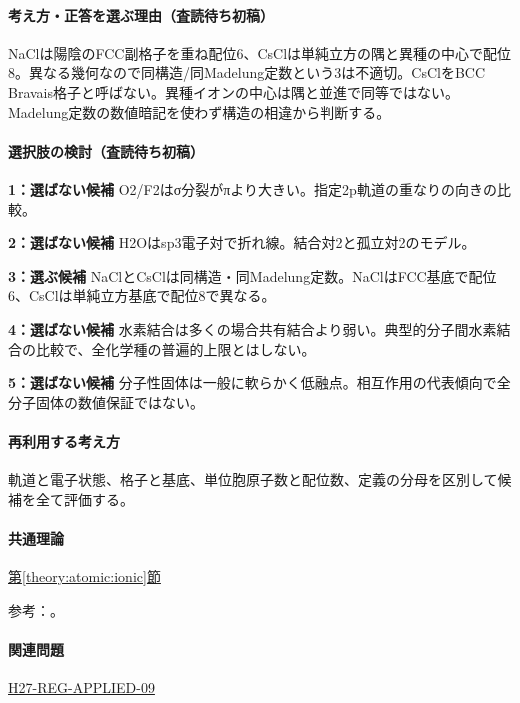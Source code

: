 \paragraph{考え方・正答を選ぶ理由（査読待ち初稿）} NaClは陽陰のFCC副格子を重ね配位6、CsClは単純立方の隅と異種の中心で配位8。異なる幾何なので同構造/同Madelung定数という3は不適切。CsClをBCC Bravais格子と呼ばない。異種イオンの中心は隅と並進で同等ではない。Madelung定数の数値暗記を使わず構造の相違から判断する。

\paragraph{選択肢の検討（査読待ち初稿）}\mbox{}\par

\noindent\textbf{1：選ばない候補} O2/F2はσ分裂がπより大きい。指定2p軌道の重なりの向きの比較。\par

\noindent\textbf{2：選ばない候補} H2Oはsp3電子対で折れ線。結合対2と孤立対2のモデル。\par

\noindent\textbf{3：選ぶ候補} NaClとCsClは同構造・同Madelung定数。NaClはFCC基底で配位6、CsClは単純立方基底で配位8で異なる。\par

\noindent\textbf{4：選ばない候補} 水素結合は多くの場合共有結合より弱い。典型的分子間水素結合の比較で、全化学種の普遍的上限とはしない。\par

\noindent\textbf{5：選ばない候補} 分子性固体は一般に軟らかく低融点。相互作用の代表傾向で全分子固体の数値保証ではない。\par

\paragraph{再利用する考え方} 軌道と電子状態、格子と基底、単位胞原子数と配位数、定義の分母を区別して候補を全て評価する。

\paragraph{共通理論} \hyperref[theory:atomic:ionic]{第\ref*{theory:atomic:ionic}節}

\par 参考：\cite{openstax_crystals}。

\paragraph{関連問題} \hyperref[q:h27-reg-applied-09]{H27-REG-APPLIED-09}

